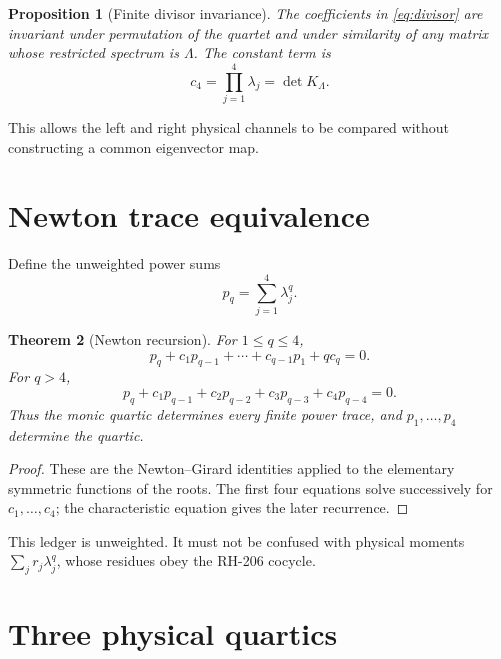 \documentclass[12pt]{article}
\newtheorem{theorem}{Theorem}[section]\newtheorem{proposition}[theorem]{Proposition}
\theoremstyle{remark}\newtheorem{remark}[theorem]{Remark}
\begin{document}
\begin{proposition}[Finite divisor invariance]\label{prop:invariance}
The coefficients in \eqref{eq:divisor} are invariant under permutation of
the quartet and under similarity of any matrix whose restricted spectrum is
$\Lambda$.  The constant term is
\begin{equation}\label{eq:det}
 c_4=\prod_{j=1}^4\lambda_j=\det K_\Lambda.
\end{equation}
\end{proposition}

This allows the left and right physical channels to be compared without
constructing a common eigenvector map.

\section{Newton trace equivalence}

Define the unweighted power sums
\begin{equation}\label{eq:power}
 p_q=\sum_{j=1}^4\lambda_j^q.
\end{equation}

\begin{theorem}[Newton recursion]\label{thm:newton}
For $1\le q\le4$,
\begin{equation}\label{eq:newton-low}
 p_q+c_1p_{q-1}+\cdots+c_{q-1}p_1+qc_q=0.
\end{equation}
For $q>4$,
\begin{equation}\label{eq:newton-high}
 p_q+c_1p_{q-1}+c_2p_{q-2}+c_3p_{q-3}+c_4p_{q-4}=0.
\end{equation}
Thus the monic quartic determines every finite power trace, and
$p_1,\ldots,p_4$ determine the quartic.
\end{theorem}

\begin{proof}
These are the Newton--Girard identities applied to the elementary symmetric
functions of the roots.  The first four equations solve successively for
$c_1,\ldots,c_4$; the characteristic equation gives the later recurrence.
\end{proof}

This ledger is unweighted.  It must not be confused with physical moments
$\sum_jr_j\lambda_j^q$, whose residues obey the RH-206 cocycle.

\section{Three physical quartics}
\end{document}
